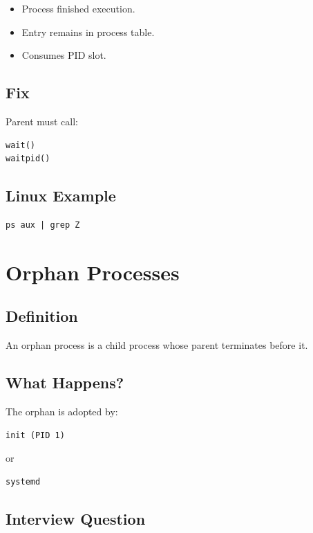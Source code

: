 \begin{itemize}
\item Process finished execution.
\item Entry remains in process table.
\item Consumes PID slot.
\end{itemize}

\subsection{Fix}

Parent must call:

\begin{verbatim}
wait()
waitpid()
\end{verbatim}

\subsection{Linux Example}

\begin{verbatim}
ps aux | grep Z
\end{verbatim}

\section{Orphan Processes}

\subsection{Definition}

An orphan process is a child process whose parent terminates before it.

\subsection{What Happens?}

The orphan is adopted by:

\begin{verbatim}
init (PID 1)
\end{verbatim}

or

\begin{verbatim}
systemd
\end{verbatim}

\subsection{Interview Question}


